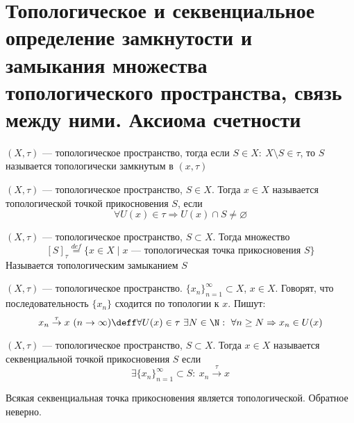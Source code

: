 \newpage
\section{Топологическое и секвенциальное определение замкнутости и замыкания множества топологического пространства, связь между ними. Аксиома счетности}
\begin{definition}
	$(X,\tau)$ --- топологическое пространство, тогда если $S \in X: \ X \setminus S \in \tau$, то $S$ называется топологически замкнутым в $(x,\tau)$
\end{definition}
\begin{definition}
	$(X, \tau)$ --- топологическое пространство, $S \in X$. Тогда $x \in X$ называется топологической точкой прикосновения $S$, если 
	$$
	\forall U(x) \in \tau \Rightarrow U(x) \cap S \neq \varnothing
	$$
\end{definition}
\begin{definition}
	$(X,\tau)$ --- топологическое пространство, $S \subset X$. Тогда множество
	$$
	[S]_\tau \stackrel{def}= \{x \in X \mid x \text{ --- топологическая точка прикосновения } S \}
	$$
	Называется топологическим замыканием $S$
\end{definition}
\begin{definition}
	$(X, \tau)$ --- топологическое пространство. $\{x_n\}_{n=1}^\infty \subset X$, $x \in X$. Говорят, что последовательность $\{x_n\}$ сходится по топологии к $x$. Пишут:
	$$
	x_n \stackrel{\tau}{\rightarrow} x \ (n \rightarrow \infty) \deff \forall U(x) \in \tau \ \exists N \in \N : \ \forall n \geq N \Rightarrow x_n \in U(x)
	$$
\end{definition}
\begin{definition}
	$(X,\tau)$	 --- топологическое пространство, $S \subset X$. Тогда $x \in X$ называется секвенциальной точкой прикосновения $S$ если
	$$
	\exists \{x_n\}_{n=1}^\infty \subset S : \ x_n \stackrel{\tau}{\longrightarrow} x 
	$$
\end{definition}
\begin{claim}
	Всякая секвенциальная точка прикосновения является топологической. Обратное неверно.
\end{claim}
